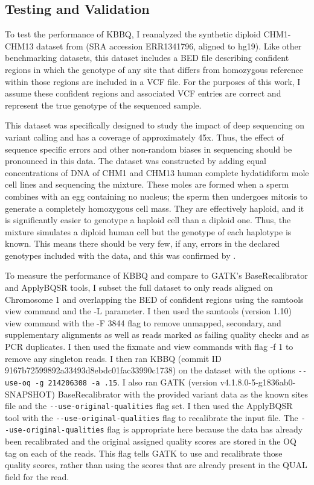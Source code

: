 \subsection{Testing and Validation}
To test the performance of KBBQ, I reanalyzed the synthetic diploid CHM1-CHM13 dataset from \textcite{li_synthetic-diploid_2018} (SRA accession ERR1341796, aligned to hg19). Like other benchmarking datasets, this dataset includes a BED file describing confident regions in which the genotype of any site that differs from homozygous reference within those regions are included in a VCF file. For the purposes of this work, I assume these confident regions and associated VCF entries are correct and represent the true genotype of the sequenced sample.

This dataset was specifically designed to study the impact of deep sequencing on variant calling and has a coverage of approximately 45x. Thus, the effect of sequence specific errors and other non-random biases in sequencing should be pronounced in this data.
The dataset was constructed by adding equal concentrations of DNA of CHM1 and CHM13 human complete hydatidiform mole cell lines and sequencing the mixture. These moles are formed when a sperm combines with an egg containing no nucleus; the sperm then undergoes mitosis to generate a completely homozygous cell mass. They are effectively haploid, and it is significantly easier to genotype a haploid cell than a diploid one. Thus, the mixture simulates a diploid human cell but the genotype of each haplotype is known. This means there should be very few, if any, errors in the declared genotypes included with the data, and this was confirmed by \textcite{li_synthetic-diploid_2018}.

To measure the performance of KBBQ and compare to GATK's BaseRecalibrator and ApplyBQSR tools, I subset the full dataset to only reads aligned on Chromosome 1 and overlapping the BED of confident regions using the samtools view command \parencite{li_sequence_2009} and the -L parameter. I then used the samtools (version 1.10) view command with the -F 3844 flag to remove unmapped, secondary, and supplementary alignments as well as reads marked as failing quality checks and as PCR duplicates. I then used the fixmate and view commands with flag -f 1 to remove any singleton reads. I then ran KBBQ (commit ID 9167b72599892a33493d8ebdc01fac33990c1738) on the dataset with the options \texttt{-\phantom{}-use-oq -g 214206308 -a .15}. I also ran GATK (version v4.1.8.0-5-g1836ab0-SNAPSHOT) BaseRecalibrator with the provided variant data as the known sites file and the \texttt{-\phantom{}-use-original-qualities} flag set. I then used the ApplyBQSR tool with the \texttt{-\phantom{}-use-original-qualities} flag to recalibrate the input file. The \texttt{-\phantom{}-use-original-qualities} flag is appropriate here because the data has already been recalibrated and the original assigned quality scores are stored in the OQ tag on each of the reads. This flag tells GATK to use and recalibrate those quality scores, rather than using the scores that are already present in the QUAL field for the read.

